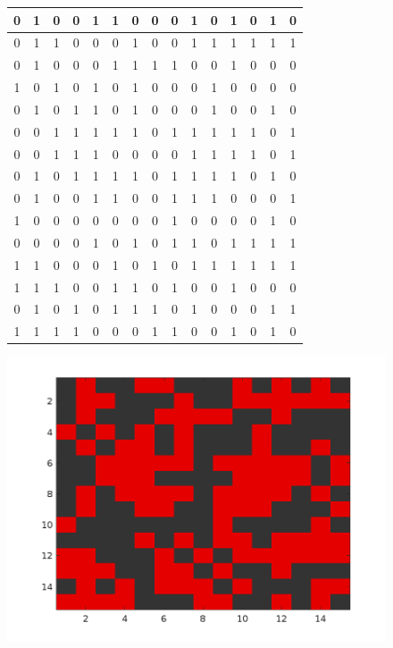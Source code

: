\begin{figure}[H]
	\centering
     \scriptsize %
	\setlength{\tabcolsep}{5.5pt} %
	\renewcommand{\arraystretch}{1.3} %
	\begin{minipage}{0.45\textwidth}
		\centering
		\begin{tabular}{|*{15}{c|}}
			\hline
			0 & 1 & 0 & 0 & 1 & 1 & 0 & 0 & 0 & 1 & 0 & 1 & 0 & 1 & 0 \\
			\hline
			0 & 1 & 1 & 0 & 0 & 0 & 1 & 0 & 0 & 1 & 1 & 1 & 1 & 1 & 1 \\
			\hline
			0 & 1 & 0 & 0 & 0 & 1 & 1 & 1 & 1 & 0 & 0 & 1 & 0 & 0 & 0 \\
			\hline
			1 & 0 & 1 & 0 & 1 & 0 & 1 & 0 & 0 & 0 & 1 & 0 & 0 & 0 & 0 \\
			\hline
			0 & 1 & 0 & 1 & 1 & 0 & 1 & 0 & 0 & 0 & 1 & 0 & 0 & 1 & 0 \\
			\hline
			0 & 0 & 1 & 1 & 1 & 1 & 1 & 0 & 1 & 1 & 1 & 1 & 1 & 0 & 1 \\
			\hline
			0 & 0 & 1 & 1 & 1 & 0 & 0 & 0 & 0 & 1 & 1 & 1 & 1 & 0 & 1 \\
			\hline
			0 & 1 & 0 & 1 & 1 & 1 & 1 & 0 & 1 & 1 & 1 & 1 & 0 & 1 & 0 \\
			\hline
			0 & 1 & 0 & 0 & 1 & 1 & 0 & 0 & 1 & 1 & 1 & 0 & 0 & 0 & 1 \\
			\hline
			1 & 0 & 0 & 0 & 0 & 0 & 0 & 0 & 1 & 0 & 0 & 0 & 0 & 1 & 0 \\
			\hline
			0 & 0 & 0 & 0 & 1 & 0 & 1 & 0 & 1 & 1 & 0 & 1 & 1 & 1 & 1 \\
			\hline
			1 & 1 & 0 & 0 & 0 & 1 & 0 & 1 & 0 & 1 & 1 & 1 & 1 & 1 & 1 \\
			\hline
			1 & 1 & 1 & 0 & 0 & 1 & 1 & 0 & 1 & 0 & 0 & 1 & 0 & 0 & 0 \\
			\hline
			0 & 1 & 0 & 1 & 0 & 1 & 1 & 1 & 0 & 1 & 0 & 0 & 0 & 1 & 1 \\
			\hline
			1 & 1 & 1 & 1 & 0 & 0 & 0 & 1 & 1 & 0 & 0 & 1 & 0 & 1 & 0 \\
			\hline
		\end{tabular}
 	\end{minipage}
	\hfill
	\begin{minipage}{0.5\textwidth}
		\centering
		\includegraphics[width=\linewidth]{images/basegrid}

\end{minipage}
\end{figure}

